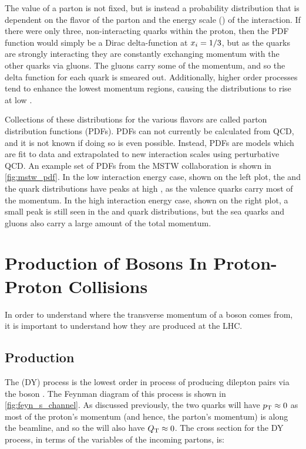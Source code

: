 The  value of a parton is not fixed, but is instead a probability
distribution that is dependent on the flavor of the parton and the energy scale
(\InteractionEnergy) of the interaction. If there were only three,
non-interacting quarks within the proton, then the PDF function would simply be
a Dirac delta-function at $x_{i} = 1/3$, but as the quarks are strongly
interacting they are constantly exchanging momentum with the other quarks via
gluons. The gluons carry some of the momentum, and so the delta function for
each quark is smeared out. Additionally, higher order processes tend to enhance
the lowest momentum regions, causing the distributions to rise at low
.

Collections of these distributions for the various flavors are called parton
distribution functions (PDFs). PDFs can not currently be calculated from QCD,
and it is not known if doing so is even possible. Instead, PDFs are models
which are fit to data and extrapolated to new interaction scales using
perturbative QCD. An example set of PDFs from the MSTW
collaboration\cite{martin_2009} is shown in \cref{fig:mstw_pdf}. In the low
interaction energy case, shown on the left plot, the \upquark and the
\downquark quark distributions have peaks at high , as the valence
quarks carry most of the momentum. In the high interaction energy case, shown
on the right plot, a small peak is still seen in the \upquark and \downquark
quark distributions, but the sea quarks and gluons also carry a large amount of
the total momentum.



\section{Production of \texorpdfstring{\Z}{Z} Bosons In Proton-Proton Collisions}
\label{sec:z_production}

In order to understand where the transverse momentum of a \Z boson comes from,
it is important to understand how they are produced at the LHC.

\subsection{\DrellYan Production}
\label{ssec:dy_production}

The \DrellYan (DY) process is the lowest order in \alphastrong process of
producing dilepton pairs via the \Z boson \cite{drell_1970}\cite{drell_1970a}.
The Feynman diagram of this process is shown in \cref{fig:feyn_s_channel}. As
discussed previously, the two quarks will have $p_{\mathrm{T}} \approx 0$ as most of the
proton's momentum (and hence, the parton's momentum) is along the beamline, and
so the \Z will also have $Q_{\mathrm{T}} \approx 0$. The cross section for the DY
process, in terms of the  variables of the incoming partons, is:

